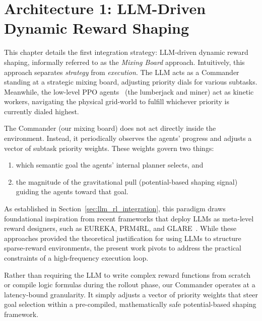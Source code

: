 \section{Architecture 1: LLM-Driven Dynamic Reward Shaping}
\label{ch:dynamic_implementation}

This chapter details the first integration strategy: LLM-driven dynamic reward shaping, informally referred to as the \emph{Mixing Board} approach.
Intuitively, this approach separates \emph{strategy} from \emph{execution}. The LLM acts as a Commander standing at a strategic mixing board, adjusting priority dials for various subtasks. Meanwhile, the low-level PPO agents~\parencite{Yu_Velu_Vinitsky_Gao_Wang_Bayen_Wu_2022} (the lumberjack and miner) act as kinetic workers, navigating the physical grid-world to fulfill whichever priority is currently dialed highest.

The Commander (our mixing board) does not act directly inside the environment. Instead, it periodically observes the agents' progress and adjusts a vector of subtask priority weights. These weights govern two things:
\begin{enumerate}
    \item which semantic goal the agents' internal planner selects, and
    \item the magnitude of the gravitational pull (potential-based shaping signal) guiding the agents toward that goal.
\end{enumerate}

As established in Section~\ref{sec:llm_rl_integration}, this paradigm draws foundational inspiration from recent frameworks that deploy LLMs as meta-level reward designers, such as EUREKA, PRM4RL, and GLARE~\parencite{ma2024eurekahumanlevelrewarddesign, Zhang_Gao_Jiang_Chen_Pan_Zhang_Deng_2025, yan2026glare}. While these approaches provided the theoretical justification for using LLMs to structure sparse-reward environments, the present work pivots to address the practical constraints of a high-frequency execution loop.

Rather than requiring the LLM to write complex reward functions from scratch or compile logic formulas during the rollout phase, our Commander operates at a latency-bound granularity. It simply adjusts a vector of priority weights that steer goal selection within a pre-compiled, mathematically safe potential-based shaping framework.


